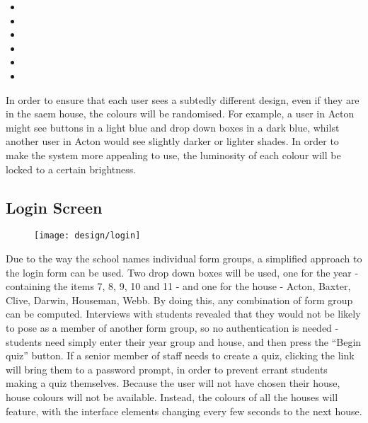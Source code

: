 \begin{itemize}[leftmargin=*]
  \item \dosis{\textcolor{specialblue}{Acton (Blue)}}
  \item \dosis{\textcolor{specialorange}{Baxter (Orange)}}
  \item \dosis{\textcolor{specialturquoise}{Clive (Turqoise)}}
  \item \dosis{\textcolor{specialpurple}{Darwin (Purple)}}
  \item \dosis{\textcolor{specialred}{Houseman (Red)}}
  \item \dosis{\textcolor{specialyellow}{Webb (Yellow)}}
\end{itemize}

In order to ensure that each user sees a subtedly different design, even if they are in the saem house, the colours will be randomised. For example, a user in Acton might see buttons in a light blue and drop down boxes in a dark blue, whilst another user in Acton would see slightly darker or lighter shades. In order to make the system more appealing to use, the luminosity of each colour will be locked to a certain brightness.

\subsection{Login Screen}
\begin{figure}[h!]
  \texttt{[image: design/login]}
\end{figure}

Due to the way the school names individual form groups, a simplified approach to the login form can be used. Two drop down boxes will be used, one for the year - containing the items 7, 8, 9, 10 and 11 - and one for the house - Acton, Baxter, Clive, Darwin, Houseman, Webb. By doing this, any combination of form group can be computed. Interviews with students revealed that they would not be likely to pose as a member of another form group, so no authentication is needed - students need simply enter their year group and house, and then press the ``Begin quiz'' button. If a senior member of staff needs to create a quiz, clicking the link will bring them to a password prompt, in order to prevent errant students making a quiz themselves. Because the user will not have chosen their house, house colours will not be available. Instead, the colours of all the houses will feature, with the interface elements changing every few seconds to the next house.


